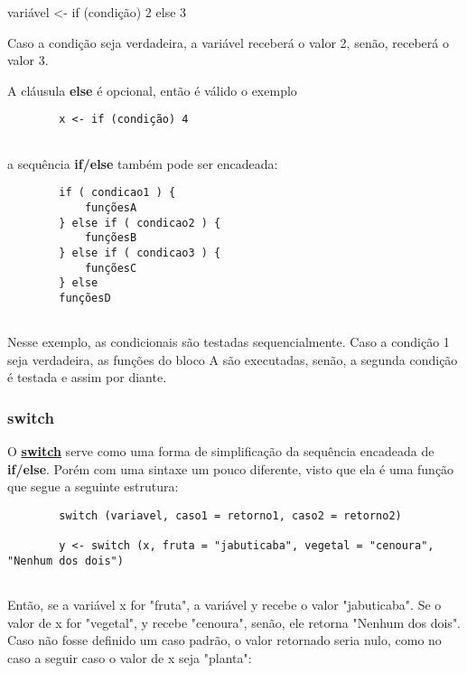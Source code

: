         variável <- if (condição) 2 else 3
        
        Caso a condição seja verdadeira, a variável receberá o valor 2, senão, receberá o valor 3.
        
        A cláusula \textbf{else} é opcional, então é válido o exemplo
        
        \color{blue}
        \begin{verbatim}
        x <- if (condição) 4
        
    \end{verbatim}
\color{black}
        a sequência \textbf{if/else} também pode  ser encadeada:
        
        \color{blue}
        \begin{verbatim}
        if ( condicao1 ) {
            funçõesA
        } else if ( condicao2 ) {
            funçõesB
        } else if ( condicao3 ) {
            funçõesC
        } else
        funçõesD
        
    \end{verbatim}
\color{black}
        Nesse exemplo, as condicionais são testadas sequencialmente. Caso a condição 1 seja verdadeira, as funções do bloco A são executadas, senão, a segunda condição é testada e assim por diante.

      \subsubsection{switch} 
      O \href{https://cran.r-project.org/doc/manuals/r-release/R-lang.html#switch}{\textbf{switch}} \cite{Team2021b} serve como uma forma de simplificação da sequência encadeada de \textbf{if/else}. Porém com uma sintaxe um pouco diferente, visto que ela é uma função que segue a seguinte estrutura:
        
        \color{blue}
        \begin{verbatim}
        switch (variavel, caso1 = retorno1, caso2 = retorno2)
        
        y <- switch (x, fruta = "jabuticaba", vegetal = "cenoura", "Nenhum dos dois")
        
    	\end{verbatim}
		\color{black}
        Então, se a variável x for "fruta", a variável y recebe o valor "jabuticaba". Se o valor de x for "vegetal", y recebe "cenoura", senão, ele retorna "Nenhum dos dois". Caso não fosse definido um caso padrão, o valor retornado seria nulo, como no caso a seguir caso o valor de x seja "planta":
        
